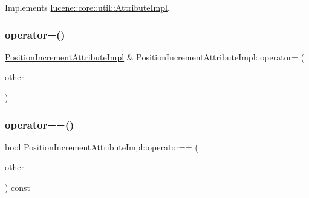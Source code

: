 Implements \mbox{\hyperlink{classlucene_1_1core_1_1util_1_1AttributeImpl_ab032e399d03ce2f58c76881cf2b92325}{lucene\+::core\+::util\+::\+Attribute\+Impl}}.

\mbox{\label{classlucene_1_1core_1_1analysis_1_1tokenattributes_1_1PositionIncrementAttributeImpl_a89b28d766574af0ba1e521adf811fe71}} 
\subsubsection{\texorpdfstring{operator=()}{operator=()}\hspace{0.1cm}{\footnotesize\ttfamily [2/2]}}
{\footnotesize\ttfamily \mbox{\hyperlink{classlucene_1_1core_1_1analysis_1_1tokenattributes_1_1PositionIncrementAttributeImpl}{Position\+Increment\+Attribute\+Impl}} \& Position\+Increment\+Attribute\+Impl\+::operator= (\begin{DoxyParamCaption}\item[{\mbox{\hyperlink{ZlibCrc32_8h_a2c212835823e3c54a8ab6d95c652660e}{const}} \mbox{\hyperlink{classlucene_1_1core_1_1analysis_1_1tokenattributes_1_1PositionIncrementAttributeImpl}{Position\+Increment\+Attribute\+Impl}} \&}]{other }\end{DoxyParamCaption})}

\mbox{\label{classlucene_1_1core_1_1analysis_1_1tokenattributes_1_1PositionIncrementAttributeImpl_a5450f58da2745c914e68e7a650e78cc3}} 
\subsubsection{\texorpdfstring{operator==()}{operator==()}}
{\footnotesize\ttfamily bool Position\+Increment\+Attribute\+Impl\+::operator== (\begin{DoxyParamCaption}\item[{\mbox{\hyperlink{ZlibCrc32_8h_a2c212835823e3c54a8ab6d95c652660e}{const}} \mbox{\hyperlink{classlucene_1_1core_1_1analysis_1_1tokenattributes_1_1PositionIncrementAttributeImpl}{Position\+Increment\+Attribute\+Impl}} \&}]{other }\end{DoxyParamCaption}) const}

